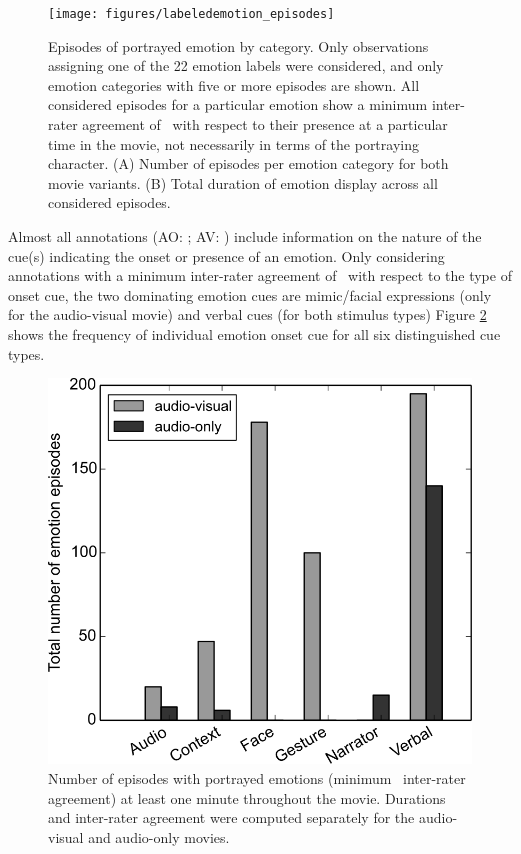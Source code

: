 \begin{figure}
  \centering
  \texttt{[image: figures/labeledemotion\_episodes]}
  \caption{Episodes of portrayed emotion by category. Only observations assigning
    one of the 22 emotion labels were considered, and only emotion categories
    with five or more episodes are shown. All considered episodes for a particular emotion
    show a minimum inter-rater agreement of \AVAggThresh\ with respect to their
    presence at a particular time in the movie, not necessarily in terms of the
    portraying character. (A) Number of episodes
    per emotion category for both movie variants. (B) Total duration of emotion
    display across all considered episodes.}
  \label{fig:threshlabeledemotion}
\end{figure}

Almost all annotations (AO: \AOFracWithLabeledOncue; AV:
\AVFracWithLabeledOncue) include information on the nature of the cue(s)
indicating the onset or presence of an emotion. Only considering annotations
with a minimum inter-rater agreement of \AVAggThresh\ with respect to the type
of onset cue, the two dominating emotion cues are mimic/facial expressions
(only for the audio-visual movie) and verbal cues (for both stimulus types)
Figure \ref{fig:threshlabeledoncue} shows the frequency of individual emotion
onset cue for all six distinguished cue types.


\begin{figure}
  \centering
  \includegraphics[width=\linewidth]{figures/labeledoncue_episodes}
  \caption{Number of episodes with portrayed emotions (minimum \AVAggThresh\
  inter-rater agreement)
  at least one minute throughout the movie. Durations and inter-rater agreement
  were computed separately for the audio-visual and audio-only movies.}
  \label{fig:threshlabeledoncue}
\end{figure}

